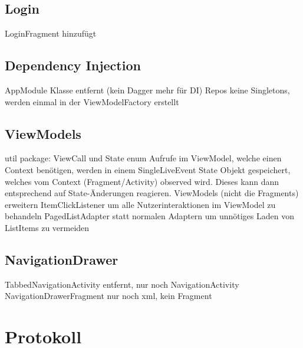\documentclass[parskip=full,11pt]{scrartcl}
\begin{document}
\subsection{Login}
LoginFragment hinzufügt

\subsection{Dependency Injection}
AppModule Klasse entfernt (kein Dagger mehr für DI)
Repos keine Singletons, werden einmal in der ViewModelFactory erstellt

\subsection{ViewModels}
util package: ViewCall und State enum
Aufrufe im ViewModel, welche einen Context benötigen, werden in einem SingleLiveEvent State Objekt gespeichert, welches vom Context (Fragment/Activity) observed wird. Dieses kann dann entsprechend auf State-Änderungen reagieren.
ViewModels (nicht die Fragments) erweitern ItemClickListener um alle Nutzerinteraktionen im ViewModel zu behandeln
PagedListAdapter statt normalen Adaptern um unnötiges Laden von ListItems zu vermeiden

\subsection{NavigationDrawer}
TabbedNavigationActivity entfernt, nur noch NavigationActivity
NavigationDrawerFragment nur noch xml, kein Fragment


\pagebreak
\section{Protokoll}
\end{document}
